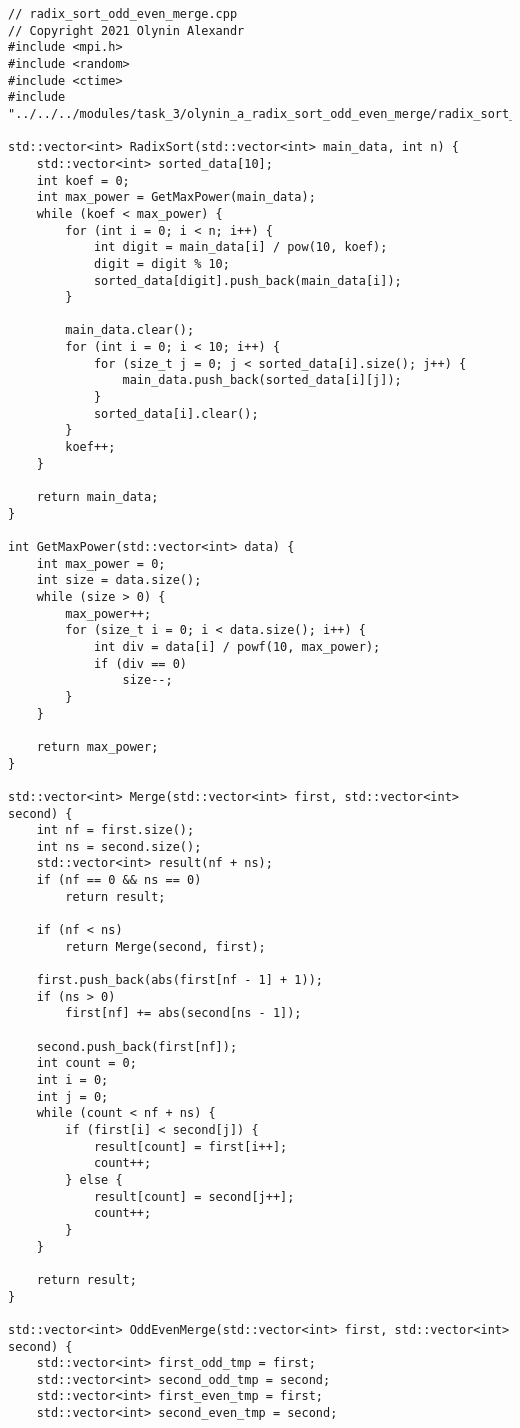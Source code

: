 \documentclass[12pt]{report}
\begin{document}
\begin{lstlisting}
// radix_sort_odd_even_merge.cpp
// Copyright 2021 Olynin Alexandr
#include <mpi.h>
#include <random>
#include <ctime>
#include "../../../modules/task_3/olynin_a_radix_sort_odd_even_merge/radix_sort_odd_even_merge.h"

std::vector<int> RadixSort(std::vector<int> main_data, int n) {
    std::vector<int> sorted_data[10];
    int koef = 0;
    int max_power = GetMaxPower(main_data);
    while (koef < max_power) {
        for (int i = 0; i < n; i++) {
            int digit = main_data[i] / pow(10, koef);
            digit = digit % 10;
            sorted_data[digit].push_back(main_data[i]);
        }

        main_data.clear();
        for (int i = 0; i < 10; i++) {
            for (size_t j = 0; j < sorted_data[i].size(); j++) {
                main_data.push_back(sorted_data[i][j]);
            }
            sorted_data[i].clear();
        }
        koef++;
    }

    return main_data;
}

int GetMaxPower(std::vector<int> data) {
    int max_power = 0;
    int size = data.size();
    while (size > 0) {
        max_power++;
        for (size_t i = 0; i < data.size(); i++) {
            int div = data[i] / powf(10, max_power);
            if (div == 0)
                size--;
        }
    }

    return max_power;
}

std::vector<int> Merge(std::vector<int> first, std::vector<int> second) {
    int nf = first.size();
    int ns = second.size();
    std::vector<int> result(nf + ns);
    if (nf == 0 && ns == 0)
        return result;

    if (nf < ns)
        return Merge(second, first);

    first.push_back(abs(first[nf - 1] + 1));
    if (ns > 0)
        first[nf] += abs(second[ns - 1]);

    second.push_back(first[nf]);
    int count = 0;
    int i = 0;
    int j = 0;
    while (count < nf + ns) {
        if (first[i] < second[j]) {
            result[count] = first[i++];
            count++;
        } else {
            result[count] = second[j++];
            count++;
        }
    }

    return result;
}

std::vector<int> OddEvenMerge(std::vector<int> first, std::vector<int> second) {
    std::vector<int> first_odd_tmp = first;
    std::vector<int> second_odd_tmp = second;
    std::vector<int> first_even_tmp = first;
    std::vector<int> second_even_tmp = second;


\end{lstlisting}
\end{document}
